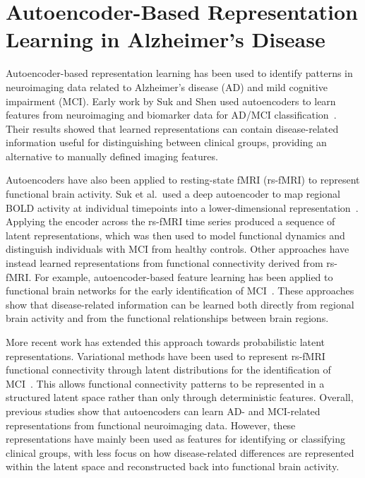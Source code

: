 \section{Autoencoder-Based Representation Learning in Alzheimer's Disease}
Autoencoder-based representation learning has been used to identify patterns in neuroimaging data related to Alzheimer’s disease (AD) and mild cognitive impairment (MCI). 
Early work by Suk and Shen used autoencoders to learn features from neuroimaging and biomarker data for AD/MCI classification~\cite{SukShen2013}. 
Their results showed that learned representations can contain disease-related information useful for distinguishing between clinical groups, providing an alternative to manually defined imaging features.

Autoencoders have also been applied to resting-state fMRI (rs-fMRI) to represent functional brain activity. 
Suk et al.\ used a deep autoencoder to map regional BOLD activity at individual timepoints into a lower-dimensional representation~\cite{SukStateSpace}. 
Applying the encoder across the rs-fMRI time series produced a sequence of latent representations, which was then used to model functional dynamics and distinguish individuals with MCI from healthy controls. 
Other approaches have instead learned representations from functional connectivity derived from rs-fMRI.\@ 
For example, autoencoder-based feature learning has been applied to functional brain networks for the early identification of MCI~\cite{EarlyDiagnosis2018}. 
These approaches show that disease-related information can be learned both directly from regional brain activity and from the functional relationships between brain regions.

More recent work has extended this approach towards probabilistic latent representations. 
Variational methods have been used to represent rs-fMRI functional connectivity through latent distributions for the identification of MCI~\cite{FCLatentDistributions2023}.
This allows functional connectivity patterns to be represented in a structured latent space rather than only through deterministic features. 
Overall, previous studies show that autoencoders can learn AD- and MCI-related representations from functional neuroimaging data. 
However, these representations have mainly been used as features for identifying or classifying clinical groups, with less focus on how disease-related differences are represented within the latent space and reconstructed back into functional brain activity.